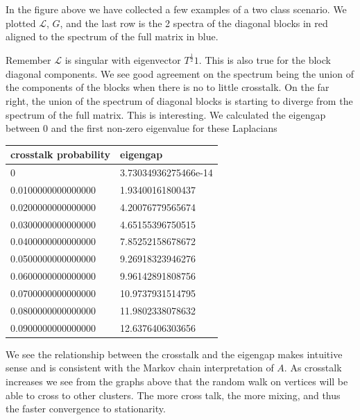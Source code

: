 In the figure above we have collected a few examples of a two class scenario.  We plotted $\mathcal{L}$, $G$, and the last row is the 2 spectra of the diagonal blocks in red aligned to the spectrum of the full matrix in blue.  

Remember $\mathcal{L}$ is singular with eigenvector $T^{\frac{1}{2}} 1$.  This is also true for the block diagonal components.  We see good agreement on the spectrum being the union of the components of the blocks when there is no to little crosstalk. On the far right, the union of the spectrum of diagonal blocks is starting to diverge from the spectrum of the full matrix.  This is interesting.  We calculated the eigengap between 0 and the first non-zero eigenvalue for these Laplacians

\begin{table}[h!]
\begin{tabular}{ll}
crosstalk probability & eigengap             \\
\hline
0                     & 3.73034936275466e-14 \\
0.0100000000000000    & 1.93400161800437     \\
0.0200000000000000    & 4.20076779565674     \\
0.0300000000000000    & 4.65155396750515     \\
0.0400000000000000    & 7.85252158678672     \\
0.0500000000000000    & 9.26918323946276     \\
0.0600000000000000    & 9.96142891808756     \\
0.0700000000000000    & 10.9737931514795     \\
0.0800000000000000    & 11.9802338078632     \\
0.0900000000000000    & 12.6376406303656    
\end{tabular}
\end{table}

We see the relationship between the crosstalk and the eigengap makes intuitive sense and is consistent with the Markov chain interpretation of $A$.  As crosstalk increases we see from the graphs above that the random walk on vertices will be able to cross to other clusters.  The more cross talk, the more mixing, and thus the faster convergence to stationarity. 


















